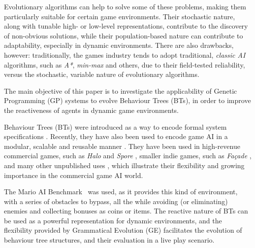 \documentclass[conference]{IEEEtran}
\begin{document}
Evolutionary algorithms can help to solve some of these problems, making them
particularly suitable for certain game environments. Their stochastic nature,
along with tunable high- or low-level representations, contribute to the
discovery of non-obvious solutions, while their population-based nature can
contribute to adaptability, especially in dynamic environments. There are
also drawbacks, however: traditionally, the games industry tends to adopt
traditional, \textit{classic AI} algorithms, such as \textit{A*},
\textit{min-max} and others, due to their field-tested reliability, versus the
stochastic, variable nature of evolutionary algorithms.

The main objective of this paper is to investigate the applicability of Genetic
Programming \cite{Koz92} (GP) systems to evolve Behaviour Trees \cite{CH07}
(BTs), in order to improve the reactiveness of agents in dynamic game environments. 

Behaviour Trees (BTs) were introduced as a way to encode
formal system specifications \cite{CH07}. Recently, they have also been
used to encode game AI in a modular, scalable and reusable
manner \cite{CDC10}. They have been used in high-revenue commercial games, such
as \textit{Halo} \cite{Isl05} and \textit{Spore} \cite{Mch07}, smaller indie games, such
as \textit{Fa\c{c}ade} \cite{MS04}, and many other unpublished uses
\cite{CDC10}, which illustrate their flexibility and growing importance in the
commercial game AI world.

The Mario AI Benchmark~\cite{TKK09} was used, as it provides this kind of environment, with
a series of obstacles to bypass, all the while avoiding (or eliminating)
enemies and collecting bonuses as coins or items. The reactive nature of BTs can 
be used as a powerful representation for dynamic environments, and the flexibility 
provided by Grammatical Evolution \cite{OR03} (GE) facilitates the evolution of
behaviour tree structures, and their evaluation in a live play scenario.
\end{document}
